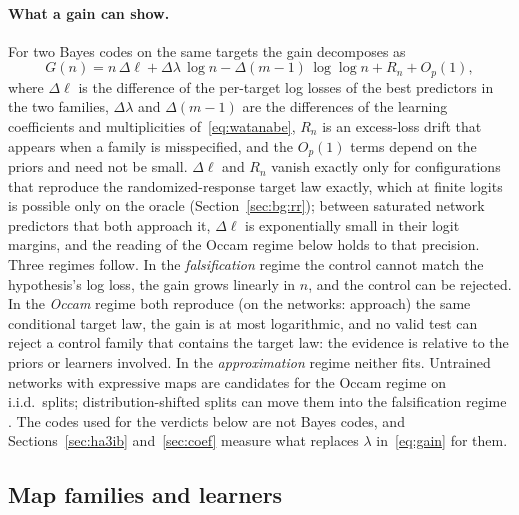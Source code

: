 \documentclass[11pt,a4paper]{article}
\begin{document}
\paragraph{What a gain can show.} For two Bayes codes on the same targets the gain decomposes as
\begin{equation}
G(n)=n\,\Delta\ell+\Delta\lambda\,\log n-\Delta(m-1)\,\log\log n+R_n+O_p(1),
\label{eq:gain}
\end{equation}
where $\Delta\ell$ is the difference of the per-target log losses of the best predictors in the two families, $\Delta\lambda$ and $\Delta(m-1)$ are the differences of the learning coefficients and multiplicities of~\eqref{eq:watanabe}, $R_n$ is an excess-loss drift that appears when a family is misspecified, and the $O_p(1)$ terms depend on the priors and need not be small. $\Delta\ell$ and $R_n$ vanish exactly only for configurations that reproduce the randomized-response target law exactly, which at finite logits is possible only on the oracle (Section~\ref{sec:bg:rr}); between saturated network predictors that both approach it, $\Delta\ell$ is exponentially small in their logit margins, and the reading of the Occam regime below holds to that precision. Three regimes follow. In the \emph{falsification} regime the control cannot match the hypothesis's log loss, the gain grows linearly in $n$, and the control can be rejected. In the \emph{Occam} regime both reproduce (on the networks: approach) the same conditional target law, the gain is at most logarithmic, and no valid test can reject a control family that contains the target law: the evidence is relative to the priors or learners involved. In the \emph{approximation} regime neither fits. Untrained networks with expressive maps are candidates for the Occam regime on i.i.d.\ splits; distribution-shifted splits can move them into the falsification regime \cite{sutter2025}. The codes used for the verdicts below are not Bayes codes, and Sections~\ref{sec:ha3ib} and~\ref{sec:coef} measure what replaces $\lambda$ in~\eqref{eq:gain} for them.

\subsection{Map families and learners}
\label{sec:score:learners}
\end{document}
